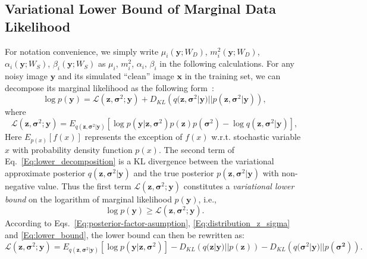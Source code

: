 \documentclass{article}
\begin{document}
\vspace{-2mm}\subsection{Variational Lower Bound of Marginal Data Likelihood}\vspace{-2mm}
For notation convenience, we simply write $\mu_i(\bm{y};W_{D})$, $m_i^2(\bm{y};W_{D})$,
$\alpha_i(\bm{y};W_{S})$, $\beta_i(\bm{y};W_{S})$ as $\mu_i$, $m_i^2$, $\alpha_i$, $\beta_i$ in
the following calculations. For any noisy image $\bm{y}$ and its simulated ``clean'' image $\bm{x}$ in the
training set, we can decompose its marginal likelihood as the following form~\cite{blei2006variational}:
\begin{equation}
    \log p(\bm{y}) = \mathcal{L}(\bm{z},\bm{\sigma}^2;\bm{y})
                            + D_{KL}\left(q(\bm{z},\bm{\sigma}^2|\bm{y})||p(\bm{z},\bm{\sigma}^2|\bm{y}) \right),
    \label{Eq:lower_decomposition}
\end{equation}
where
\begin{equation}
    \mathcal{L}(\bm{z},\bm{\sigma}^2;\bm{y}) = E_{q(\bm{z},\bm{\sigma}^2|\bm{y})}
    \left[\log p(\bm{y}|\bm{z},\bm{\sigma}^2)p(\bm{z})p(\bm{\sigma}^2)-\log q(\bm{z},\bm{\sigma}^2|\bm{y})  \right],
    \label{Eq:lower_bound}
\end{equation}
Here $E_{p(x)}[f(x)]$ represents the exception of $f(x)$ w.r.t. stochastic variable $x$ with probability density
function $p(x)$. The second term of Eq.~\eqref{Eq:lower_decomposition} is a KL divergence between the variational
approximate posterior $q(\bm{z},\bm{\sigma}^2|\bm{y})$ and the true posterior $p(\bm{z},\bm{\sigma}^2|\bm{y})$ with
non-negative value. Thus the first term $\bm{\mathcal{L}}(\bm{z},\bm{\sigma}^2;\bm{y})$ constitutes a
\textit{variational lower bound} on the logarithm of marginal likelihood $p(\bm{y})$, i.e.,
\begin{equation}
    \log p(\bm{y}) \ge \mathcal{L} (\bm{z},\bm{\sigma}^2;\bm{y}).
    \label{Eq:nonequal_bound}
\end{equation}
According to Eqs.~\eqref{Eq:posterior-factor-asumption}, \eqref{Eq:distribution_z_sigma} and \eqref{Eq:lower_bound}, the
lower bound can then be rewritten as:
\begin{equation}
    \mathcal{L}(\bm{z},\bm{\sigma}^2;\bm{y})=E_{q(\bm{z},\bm{\sigma}^2|\bm{y})}
    \left[ \log p(\bm{y}|\bm{z},\bm{\sigma}^2) \right]
    - D_{KL}\left(q(\bm{z}|\bm{y}) || p(\bm{z}) \right)
    - D_{KL} \left(q(\bm{\sigma}^2|\bm{y}) || p(\bm{\sigma^2}) \right).
    \label{Eq:lower_bound_factor}
\end{equation}
\end{document}
